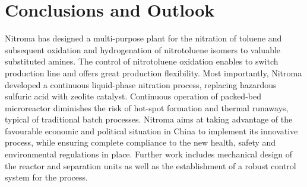 \section{Conclusions and Outlook}
\label{sec:conclu}
Nitroma has designed a multi-purpose plant for the nitration of toluene and subsequent oxidation and hydrogenation of nitrotoluene isomers to valuable substituted amines. The control of nitrotoluene oxidation enables to switch production line and offers great production flexibility. Most importantly, Nitroma developed a continuous liquid-phase nitration process, replacing hazardous sulfuric acid with zeolite catalyst. Continuous operation of packed-bed microreactor diminishes the risk of hot-spot formation and thermal runaways, typical of traditional batch processes. Nitroma aims at taking advantage of the favourable economic and political situation in China to implement its innovative process, while ensuring complete compliance to the new health, safety and environmental regulations in place. Further work includes mechanical design of the reactor and separation units as well as the establishment of a robust control system for the process. 